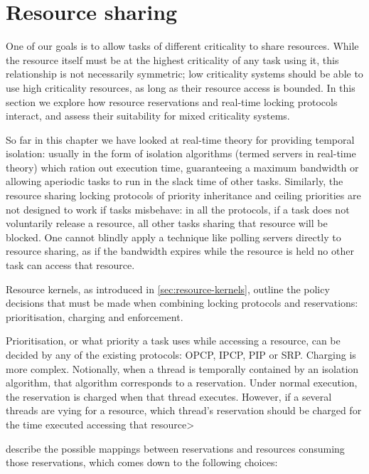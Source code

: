 \section{Resource sharing}

One of our goals is to allow tasks of different criticality to share resources.  While the resource
itself must be at the highest criticality of any task using it, this relationship is not
necessarily symmetric; low criticality systems should be able to use high criticality resources, as
long as their resource access is bounded. 
In this section we explore how resource reservations and real-time locking protocols interact, and
assess their suitability for mixed criticality systems.

So far in this chapter we have looked at real-time
theory for providing temporal isolation: usually in the form of isolation algorithms (termed servers
in real-time theory) which
ration out execution time, guaranteeing a maximum bandwidth or allowing aperiodic tasks to run in
the slack time of other tasks. Similarly, the resource sharing locking protocols of priority
inheritance and ceiling priorities are not designed to work if tasks misbehave: in all the
protocols, if a
task does not voluntarily release a resource, all other tasks sharing that resource will be
blocked. One cannot blindly apply a technique like polling servers directly to resource sharing, as if the
bandwidth expires while the resource is held no other task can access that resource.

Resource kernels, as introduced in \cref{sec:resource-kernels}, outline the policy decisions that
must be made when combining locking protocols and reservations: prioritisation, charging and
enforcement. 

Prioritisation, or what priority a task uses while accessing a resource, can be decided by any of
the existing protocols: \gls{OPCP}, \gls{IPCP}, \gls{PIP} or \gls{SRP}. Charging is more complex.
Notionally, when a thread is temporally contained by an isolation algorithm, that algorithm
corresponds to a reservation. Under normal execution, the reservation is charged when that thread
executes. However, if a several threads are vying for a resource, which thread's reservation should
be charged for the time executed accessing that resource> 

\citet{deNiz_LSR_01} describe the possible mappings
between reservations and resources consuming those reservations, which comes down to the following
choices:

